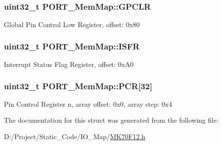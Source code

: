 \subsubsection[{G\+P\+C\+L\+R}]{\setlength{\rightskip}{0pt plus 5cm}uint32\+\_\+t P\+O\+R\+T\+\_\+\+Mem\+Map\+::\+G\+P\+C\+L\+R}\label{struct_p_o_r_t___mem_map_a837c289643f8cec958b1f01c086b558a}
Global Pin Control Low Register, offset\+: 0x80 \hypertarget{struct_p_o_r_t___mem_map_a53c86a08f430dc915a312efe74ba83e6}{}
\subsubsection[{I\+S\+F\+R}]{\setlength{\rightskip}{0pt plus 5cm}uint32\+\_\+t P\+O\+R\+T\+\_\+\+Mem\+Map\+::\+I\+S\+F\+R}\label{struct_p_o_r_t___mem_map_a53c86a08f430dc915a312efe74ba83e6}
Interrupt Status Flag Register, offset\+: 0x\+A0 \hypertarget{struct_p_o_r_t___mem_map_a1c54a8f1741fade8daf28198fee43ddd}{}
\subsubsection[{P\+C\+R}]{\setlength{\rightskip}{0pt plus 5cm}uint32\+\_\+t P\+O\+R\+T\+\_\+\+Mem\+Map\+::\+P\+C\+R\mbox{[}32\mbox{]}}\label{struct_p_o_r_t___mem_map_a1c54a8f1741fade8daf28198fee43ddd}
Pin Control Register n, array offset\+: 0x0, array step\+: 0x4 

The documentation for this struct was generated from the following file\+:\begin{DoxyCompactItemize}
\item 
D\+:/\+Project/\+Static\+\_\+\+Code/\+I\+O\+\_\+\+Map/\hyperlink{_m_k70_f12_8h}{M\+K70\+F12.\+h}\end{DoxyCompactItemize}
